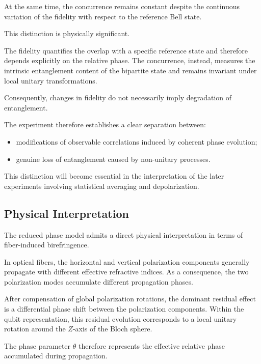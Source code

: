 At the same time, the concurrence remains constant despite the continuous variation of the fidelity with respect to the reference Bell state.

This distinction is physically significant.

The fidelity quantifies the overlap with a specific reference state and therefore depends explicitly on the relative phase. The concurrence, instead, measures the intrinsic entanglement content of the bipartite state and remains invariant under local unitary transformations.

Consequently, changes in fidelity do not necessarily imply degradation of entanglement.

The experiment therefore establishes a clear separation between:

\begin{itemize}
    \item modifications of observable correlations induced by coherent phase evolution;
    \item genuine loss of entanglement caused by non-unitary processes.
\end{itemize}

This distinction will become essential in the interpretation of the later experiments involving statistical averaging and depolarization.


\subsection*{Physical Interpretation}

The reduced phase model admits a direct physical interpretation in terms of fiber-induced birefringence.

In optical fibers, the horizontal and vertical polarization components generally propagate with different effective refractive indices. As a consequence, the two polarization modes accumulate different propagation phases.

After compensation of global polarization rotations, the dominant residual effect is a differential phase shift between the polarization components. Within the qubit representation, this residual evolution corresponds to a local unitary rotation around the \(Z\)-axis of the Bloch sphere.

The phase parameter \( \theta \) therefore represents the effective relative phase accumulated during propagation.

